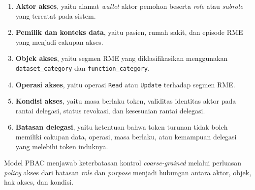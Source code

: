 \begin{enumerate}
	\item \textbf{Aktor akses}, yaitu alamat \textit{wallet} aktor pemohon beserta \textit{role} atau \textit{subrole} yang tercatat pada sistem.

	\item \textbf{Pemilik dan konteks data}, yaitu pasien, rumah sakit, dan episode RME yang menjadi cakupan akses.

	\item \textbf{Objek akses}, yaitu segmen RME yang diklasifikasikan menggunakan \texttt{dataset\_category} dan \texttt{function\_category}.

	\item \textbf{Operasi akses}, yaitu operasi \texttt{Read} atau \texttt{Update} terhadap segmen RME.

	\item \textbf{Kondisi akses}, yaitu masa berlaku token, validitas identitas aktor pada rantai delegasi, status revokasi, dan kesesuaian rantai delegasi.

	\item \textbf{Batasan delegasi}, yaitu ketentuan bahwa token turunan tidak boleh memiliki cakupan data, operasi, masa berlaku, atau kemampuan delegasi yang melebihi token induknya.

\end{enumerate}

Model PBAC menjawab keterbatasan kontrol \textit{coarse-grained} melalui perluasan \textit{policy} akses dari batasan \textit{role} dan \textit{purpose} menjadi hubungan antara aktor, objek, hak akses, dan kondisi.
